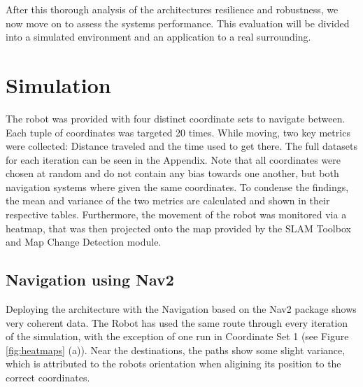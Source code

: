\documentclass[%
paper=A4,               %
twoside=true,           %
openright,              %
11pt,                   %
bibliography=totoc,     %
titlepage=on,           %
DIV=12,                 %
BCOR=1.5cm,             %
parskip=half,            %
final
]{scrreprt}
\begin{document}
	After this thorough analysis of the architectures resilience and robustness, we now move on to assess the systems performance. This evaluation will be divided into a simulated environment and an application to a real surrounding. 
	\section{Simulation} 
	The robot was provided with four distinct coordinate sets to navigate between. Each tuple of coordinates was targeted 20 times. While moving, two key metrics were collected: Distance traveled and the time used to get there. The full datasets for each iteration can be seen in the Appendix. Note that all coordinates were chosen at random and do not contain any bias towards one another, but both navigation systems where given the same coordinates. 
	To condense the findings, the mean and variance of the two metrics are calculated and shown in their respective tables. Furthermore, the movement of the robot was monitored via a heatmap, that was then projected onto the map provided by the SLAM Toolbox and Map Change Detection module.
	
	\subsection{Navigation using Nav2}
	Deploying the architecture with the Navigation based on the Nav2 package shows very coherent data. The Robot has used the same route through every iteration of the simulation, with the exception of one run in Coordinate Set 1 (see Figure \ref{fig:heatmaps} (a)). Near the destinations, the paths show some slight variance, which is attributed to the robots orientation when aligining its position to the correct coordinates. 
	
\end{document}
